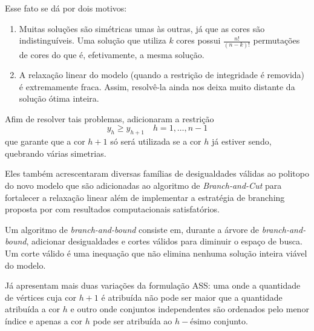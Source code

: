 \documentclass[11pt]{article}
\begin{document}
Esse fato se dá por dois motivos:
\begin{enumerate}
\item Muitas soluções são simétricas umas às outras, já que as cores são indistinguíveis. Uma solução que utiliza \(k\) cores possui \(\frac{n!}{(n-k)!}\) permutações de cores do que é, efetivamente, a mesma solução.
\item A relaxação linear do modelo (quando a restrição de integridade é removida) é extremamente fraca. Assim, resolvê-la ainda nos deixa muito distante da solução ótima inteira.
\end{enumerate}

Afim de resolver tais problemas, \textcite{MendezDiaz2006BranchCutAlgorithm} adicionaram a restrição
\[ y_h \geq y_{h+1} \quad h = 1, \dots, n-1 \]
que garante que a cor \(h+1\) só será utilizada se a cor \(h\) já estiver sendo, quebrando várias simetrias.

Eles também acrescentaram diversas famílias de desigualdades válidas ao politopo do novo modelo que são adicionadas ao algoritmo de \emph{Branch-and-Cut} para fortalecer a relaxação linear além de implementar a estratégia de branching proposta por \textcite{Brelaz1979Newmethodscolor} com resultados computacionais satisfatórios.

Um algoritmo de \emph{branch-and-bound} consiste em, durante a árvore de \emph{branch-and-bound}, adicionar desigualdades e cortes válidos para diminuir o espaço de busca. Um corte válido é uma inequação que não elimina nenhuma solução inteira viável do modelo.

Já \textcite{MendezDiaz2008CuttingPlaneAlgorithm} apresentam mais duas variações da formulação ASS: uma onde a quantidade de vértices cuja cor \(h+1\) é atribuída não pode ser maior que a quantidade atribuída a cor \(h\) e outro onde conjuntos independentes são ordenados pelo menor índice e apenas a cor \(h\) pode ser atribuída ao \(h-\text{ésimo}\) conjunto.
\end{document}
